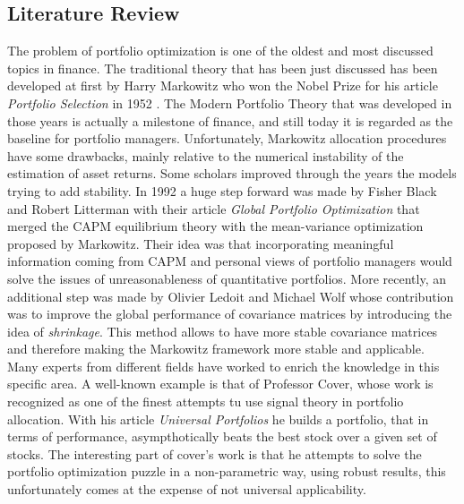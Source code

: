\documentclass[a4paper]{article}
\numberwithin{equation}{subsection}
\begin{document}





\subsection{Literature Review}

The problem of portfolio optimization is one of the oldest and most discussed topics in finance. The traditional theory that has been just discussed has been developed at first by Harry Markowitz who won the Nobel Prize for his article \textit{Portfolio Selection} in 1952 \cite{Markowitz}. The Modern Portfolio Theory that was developed in those years is actually a milestone of finance, and still today it is regarded as the baseline for portfolio managers. Unfortunately, Markowitz allocation procedures have some drawbacks, mainly relative to the numerical instability of the estimation of asset returns. Some scholars improved through the years the models trying to add stability. In 1992 a huge step forward was made by Fisher Black and Robert Litterman with their article \textit{Global Portfolio Optimization} \cite{black_litterman} that merged the CAPM equilibrium theory with the mean-variance optimization proposed by Markowitz. Their idea was that incorporating meaningful information coming from CAPM and personal views of portfolio managers would solve the issues of unreasonableness of quantitative portfolios. More recently, an additional step was made by Olivier Ledoit and Michael Wolf whose contribution was to improve the global performance of covariance matrices by introducing the idea of \textit{shrinkage}. This method allows to have more stable covariance matrices and therefore making the Markowitz framework more stable and applicable.  \\
Many experts from different fields have worked to enrich the knowledge in this specific area. A well-known example is that of Professor Cover, whose work is recognized as one of the finest attempts tu use signal theory in portfolio allocation. With his article \textit{Universal Portfolios} \cite{universal_portfolios} he builds a portfolio, that in terms of performance, asympthotically beats the best stock over a given set of stocks. The interesting part of cover's work is that he attempts to solve the portfolio optimization puzzle in a non-parametric way, using robust results, this unfortunately comes at the expense of not universal applicability.\\
\end{document}
